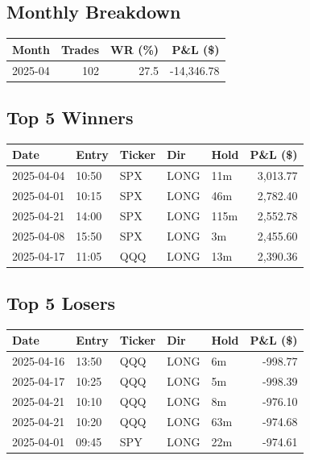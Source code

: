\documentclass[11pt,a4paper,twoside]{article}
\begin{document}
\subsection{Monthly Breakdown}
\noindent\begin{center}
\begin{tabular}{>{\color{txtmain}}l rrr}
\toprule
\rowcolor{cardbg}
\textbf{Month} & \textbf{Trades} & \textbf{WR (\%)} & \textbf{P\&L (\$)} \\
\midrule
2025-04 & 102 & 27.5 & \textcolor{lossred}{-14,346.78} \\
\bottomrule
\end{tabular}
\end{center}
\subsection{Top 5 Winners}
\noindent\begin{center}
\begin{tabular}{>{\color{txtmain}}l llll r}
\toprule
\rowcolor{cardbg}
\textbf{Date} & \textbf{Entry} & \textbf{Ticker} & \textbf{Dir} & \textbf{Hold} & \textbf{P\&L (\$)} \\
\midrule
2025-04-04 & 10:50 & SPX & LONG & 11m & \textcolor{wingreen}{3,013.77} \\
2025-04-01 & 10:15 & SPX & LONG & 46m & \textcolor{wingreen}{2,782.40} \\
2025-04-21 & 14:00 & SPX & LONG & 115m & \textcolor{wingreen}{2,552.78} \\
2025-04-08 & 15:50 & SPX & LONG & 3m & \textcolor{wingreen}{2,455.60} \\
2025-04-17 & 11:05 & QQQ & LONG & 13m & \textcolor{wingreen}{2,390.36} \\
\bottomrule
\end{tabular}
\end{center}
\subsection{Top 5 Losers}
\noindent\begin{center}
\begin{tabular}{>{\color{txtmain}}l llll r}
\toprule
\rowcolor{cardbg}
\textbf{Date} & \textbf{Entry} & \textbf{Ticker} & \textbf{Dir} & \textbf{Hold} & \textbf{P\&L (\$)} \\
\midrule
2025-04-16 & 13:50 & QQQ & LONG & 6m & \textcolor{lossred}{-998.77} \\
2025-04-17 & 10:25 & QQQ & LONG & 5m & \textcolor{lossred}{-998.39} \\
2025-04-21 & 10:10 & QQQ & LONG & 8m & \textcolor{lossred}{-976.10} \\
2025-04-21 & 10:20 & QQQ & LONG & 63m & \textcolor{lossred}{-974.68} \\
2025-04-01 & 09:45 & SPY & LONG & 22m & \textcolor{lossred}{-974.61} \\
\bottomrule
\end{tabular}
\end{center}
\clearpage
\end{document}
